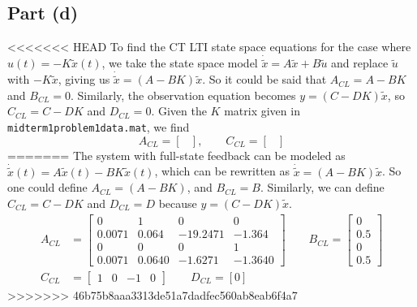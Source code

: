 \documentclass[11pt]{article}
\begin{document}
\subsection*{Part (d)}
<<<<<<< HEAD
To find the CT LTI state space equations for the case where $u(t)=-K\tilde{x}(t)$, we take the state space model $\dot{\tilde{x}}=A\tilde{x}+B\tilde{u}$ and replace $\tilde{u}$ with $-K\tilde{x}$, giving us $\dot{\tilde{x}}=(A-BK)\tilde{x}$. So it could be said that $A_{CL}=A-BK$ and $B_{CL}=0$. Similarly, the observation equation becomes $y=(C-DK)\tilde{x}$, so $C_{CL}=C-DK$ and $D_{CL}=0$. Given the $K$ matrix given in \texttt{midterm1problem1data.mat}, we find
\begin{equation*}
	A_{CL} = \begin{bmatrix} \end{bmatrix},\qquad C_{CL} = \begin{bmatrix} \end{bmatrix}
\end{equation*}
=======
The system with full-state feedback can be modeled as $\dot{\tilde{x}}(t)=A\tilde{x}(t)-BK\tilde{x}(t)$, which can be rewritten as $\dot{\tilde{x}}=(A-BK)\tilde{x}$. So one could define $A_{CL}=(A-BK)$, and $B_{CL}=B$. Similarly, we can define $C_{CL}=C-DK$ and $D_{CL}=D$ because $y=(C-DK)\tilde{x}$.
\begin{align*}
	A_{CL}&= \begin{bmatrix} 0 & 1 & 0 & 0 \\ 
							 0.0071 & 0.064 & -19.2471 & -1.364 \\
							 0 & 0 & 0 & 1 \\
							 0.0071 & 0.0640 & -1.6271 & -1.3640 \end{bmatrix}\qquad
	B_{CL} = \begin{bmatrix} 0 \\ 0.5 \\ 0 \\ 0.5 \end{bmatrix} \\
	C_{CL}&= \begin{bmatrix} 1 & 0 & -1 & 0 \end{bmatrix}\qquad
	D_{CL} = [0]
\end{align*}
>>>>>>> 46b75b8aaa3313de51a7dadfec560ab8eab6f4a7
\end{document}
